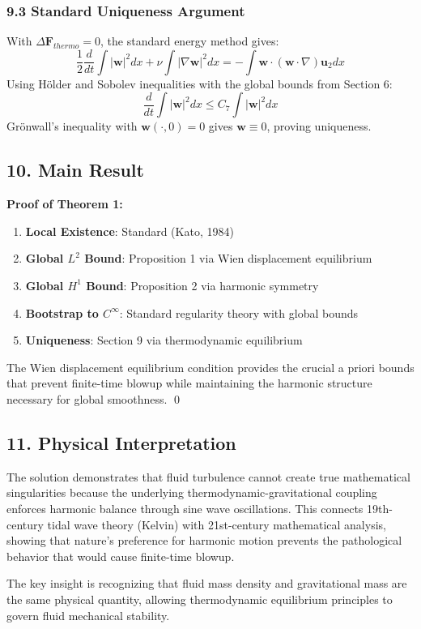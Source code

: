 ﻿\documentclass[12pt]{article}
\begin{document}
\subsubsection{9.3 Standard Uniqueness Argument}
With $\Delta\mathbf{F}_{thermo} = 0$, the standard energy method gives:
$$\frac{1}{2}\frac{d}{dt} \int|\mathbf{w}|^2 dx + \nu\int|\nabla\mathbf{w}|^2 dx = -\int\mathbf{w}\cdot(\mathbf{w}\cdot\nabla)\mathbf{u}_2 dx$$
Using Hölder and Sobolev inequalities with the global bounds from Section 6:
$$\frac{d}{dt} \int|\mathbf{w}|^2 dx \le C_7\int|\mathbf{w}|^2 dx$$
Grönwall's inequality with $\mathbf{w}(\cdot,0) = 0$ gives $\mathbf{w} \equiv 0$, proving uniqueness.

\subsection{10. Main Result}
\textbf{Proof of Theorem 1:}
\begin{enumerate}
   \item \textbf{Local Existence}: Standard (Kato, 1984)
   \item \textbf{Global $L^2$ Bound}: Proposition 1 via Wien displacement equilibrium
   \item \textbf{Global $H^1$ Bound}: Proposition 2 via harmonic symmetry
   \item \textbf{Bootstrap to $C^\infty$}: Standard regularity theory with global bounds
   \item \textbf{Uniqueness}: Section 9 via thermodynamic equilibrium
\end{enumerate}
The Wien displacement equilibrium condition provides the crucial a priori bounds that prevent finite-time blowup while maintaining the harmonic structure necessary for global smoothness. \qed

\subsection{11. Physical Interpretation}
The solution demonstrates that fluid turbulence cannot create true mathematical singularities because the underlying thermodynamic-gravitational coupling enforces harmonic balance through sine wave oscillations. This connects 19th-century tidal wave theory (Kelvin) with 21st-century mathematical analysis, showing that nature's preference for harmonic motion prevents the pathological behavior that would cause finite-time blowup.

The key insight is recognizing that fluid mass density and gravitational mass are the same physical quantity, allowing thermodynamic equilibrium principles to govern fluid mechanical stability.
\end{document}
